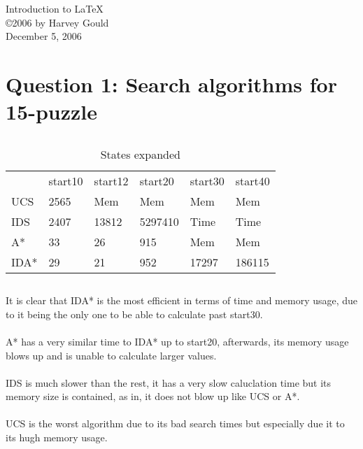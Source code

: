 \documentclass[12pt]{article}
\begin{document}
\begin{center}
{\large Introduction to \LaTeX} \\ %
\copyright 2006 by Harvey Gould \\
December 5, 2006
\end{center}

\section{Question 1: Search algorithms for 15-puzzle}

\subsection{}

\begin{table}[h]
\centering
\caption{States expanded}
\label{my-label}
\begin{tabular}{llllll}
     & start10 & start12 & start20 & start30 & start40 \\
UCS  & 2565    & Mem     & Mem     & Mem     & Mem     \\
IDS  & 2407    & 13812   & 5297410 & Time    & Time    \\
A*   & 33      & 26      & 915     & Mem     & Mem     \\
IDA* & 29      & 21      & 952     & 17297   & 186115
\end{tabular}
\end{table}

\subsection{}
It is clear that IDA* is the most efficient in terms of time and memory usage, due to it being the only one to be able to calculate past start30.\\\\
A* has a very similar time to IDA* up to start20, afterwards, its memory usage blows up and is unable to calculate larger values.\\\\
IDS is much slower than the rest, it has a very slow caluclation time but its memory size is contained, as in, it does not blow up like UCS or A*.\\\\
UCS is the worst algorithm due to its bad search times but especially due it to its hugh memory usage.\\\\
\end{document}
